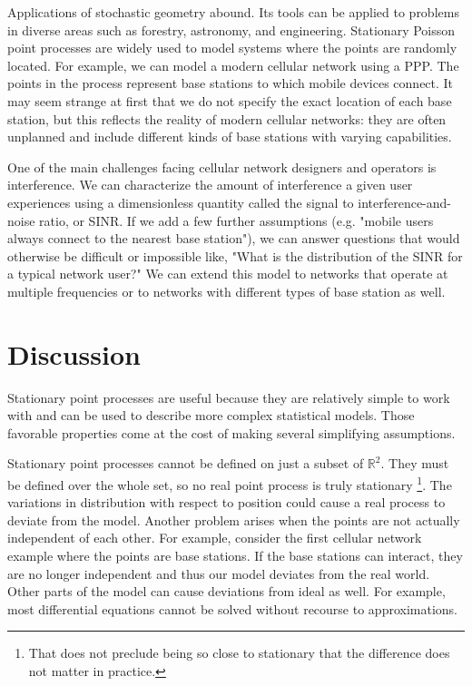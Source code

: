 \documentclass[]{article}
\begin{document}
Applications of stochastic geometry abound. Its tools can be applied to problems in diverse areas such as forestry, astronomy, and engineering. Stationary Poisson point processes are widely used to model systems where the points are randomly located. For example, we can model a modern cellular network using a PPP. The points in the process represent base stations to which mobile devices connect.  It may seem strange at first that we do not specify the exact location of each base station, but this reflects the reality of modern cellular networks: they are often unplanned and include different kinds of base stations with varying capabilities.

One of the main challenges facing cellular network designers and operators is interference. We can characterize the amount of interference a given user experiences using a dimensionless quantity called the signal to interference-and-noise ratio, or SINR. If we add a few further assumptions (e.g. "mobile users always connect to the nearest base station"), we can answer questions that would otherwise be difficult or impossible like, "What is the distribution of the SINR for a typical network user?" We can extend this model to networks that operate at multiple frequencies or to networks with different types of base station as well.

\section{Discussion}
Stationary point processes are useful because they are relatively simple to work with and can be used to describe more complex statistical models. Those favorable properties come at the cost of making several simplifying assumptions.

Stationary point processes cannot be defined on just a subset of $\mathbb{R}^2$. They must be defined over the whole set, so no real point process is truly stationary \footnote{That does not preclude being so close to stationary that the difference does not matter in practice.}. The variations in distribution with respect to position could cause a real process to deviate from the model. Another problem arises when the points are not actually independent of each other. For example, consider the first cellular network example where the points are base stations. If the base stations can interact, they are no longer independent and thus our model deviates from the real world. Other parts of the model can cause deviations from ideal as well. For example, most differential equations cannot be solved without recourse to approximations.
\end{document}
